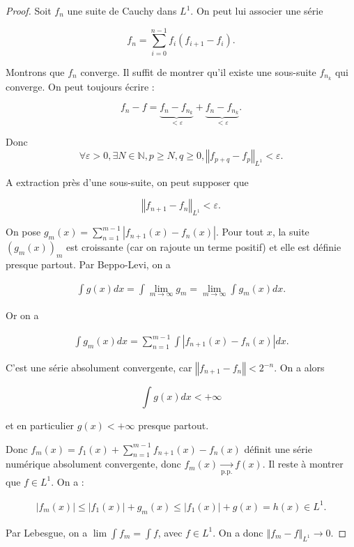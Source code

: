 \documentclass[french]{book}
\theoremstyle{definition}
\theoremstyle{remark}
\newcommand{\lesss}{<}
\newcommand{\less}{\lesss}
\newcommand{\biggg}{>}
\newcommand{\bg}{\biggg}
\begin{document}
\begin{proof}
  Soit \(f_n\) une suite de Cauchy dans \(L ^{1}\). On peut lui associer une série

  \[f_n = \sum_{i=0}^{n-1} f_i (f _{i+1} -f_i).\]

  Montrons que \(f_n\) converge. Il suffit de montrer qu'il existe une sous-suite \(f _{n_k}\) qui converge. On peut toujours écrire :

  \[f_n - f = \underbrace{f_n - f _{n_k}}_{\less \varepsilon}+ \underbrace{f_n - f _{n_k}}_{\less \varepsilon}.\]

  Donc \[\forall \varepsilon \bg 0, \exists N \in \mathbb{N}, p \geq  N, q \geq 0, \left\Vert f _{p+q} - f _{p} \right\Vert _{L ^{1}} \less \varepsilon.\]

  A extraction près d'une sous-suite, on peut supposer que

  \[\left\Vert f _{n+1}-f_n \right\Vert _{L ^{1}} \less \varepsilon.\]

  On pose \(g _{m}(x) = \displaystyle \sum_{n=1}^{m-1} \left\lvert f _{n+1}(x) - f_n(x) \right\rvert \). Pour tout \(x\), la suite \((g_m(x))_{m}\) est croissante (car on rajoute un terme positif) et elle est définie presque partout. Par Beppo-Levi, on a

  \begin{gather*}
    \int g(x) dx = \int \lim_{m \to \infty} g_m = \lim_{m \to \infty} \int g_m(x)dx.
  \end{gather*}

  Or on a

  \begin{gather*}
    \int g_m(x)dx = \sum_{n=1}^{m-1} \int \left\lvert f _{n+1}(x)-f_n(x) \right\rvert dx.
  \end{gather*}

  C'est une série absolument convergente, car \(\left\Vert f _{n+1}-f_n \right\Vert \less 2 ^{-n}\). On a alors

  \[\int g(x)dx \less +\infty\]

  et en particulier \(g(x) \less +\infty\) presque partout.

  Donc \(f_m(x) = f_1(x) + \displaystyle \sum_{n=1}^{m-1} f _{n+1}(x) - f_n(x)\) définit une série numérique absolument convergente, donc \(f_m(x) \underset{\text{p.p.}}{\longrightarrow} f(x)\). Il reste à montrer que \(f \in L ^{1}\). On a :

  \begin{gather*}
    \left\lvert f_m(x) \right\rvert \leq \left\lvert f_1(x) \right\rvert + g_m(x) \leq \left\lvert f_1(x) \right\rvert + g(x) = h(x) \in L ^{1}.
  \end{gather*}

  Par Lebesgue, on a \(\lim \int f_m = \int f\), avec \(f \in L ^{1}\). On a donc \(\left\Vert f_m - f \right\Vert _{L ^{1}} \longrightarrow 0\).
\end{proof}
\end{document}

